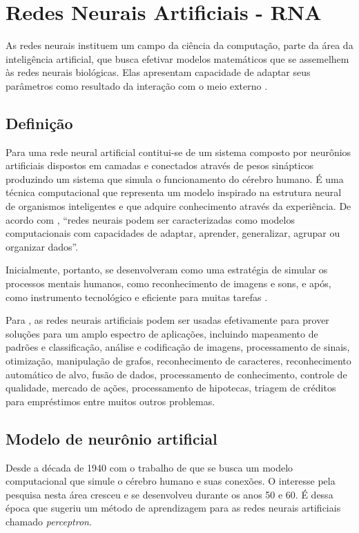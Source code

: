 \section{Redes Neurais Artificiais - RNA}
As redes neurais instituem um campo da ciência da computação, parte da área da inteligência artificial, que busca efetivar modelos matemáticos que se assemelhem às redes neurais biológicas. Elas apresentam capacidade de adaptar seus parâmetros como resultado da interação com o meio externo \cite{ferneda_redes_2006}\cite{Norvig2013}.

\subsection{Definição}

Para  uma rede neural artificial contitui-se de um sistema composto por neurônios artificiais dispostos em camadas e conectados através de pesos sinápticos produzindo um sistema que simula o funcionamento do cérebro humano. É uma técnica computacional que representa um modelo inspirado na estrutura neural de organismos inteligentes e que adquire conhecimento através da experiência. De acordo com , ``redes neurais podem ser caracterizadas como modelos computacionais com capacidades de adaptar, aprender, generalizar, agrupar ou organizar dados''.

Inicialmente, portanto, se desenvolveram como uma estratégia de simular os processos mentais humanos, como reconhecimento de imagens e sons, e após, como instrumento tecnológico e eficiente para muitas tarefas \cite{jin_development_2002}.	

Para , as redes neurais artificiais podem ser usadas efetivamente para prover soluções para um amplo espectro de aplicações, incluindo mapeamento de padrões e classificação, análise e codificação de imagens, processamento de sinais, otimização, manipulação de grafos, reconhecimento de caracteres, reconhecimento automático de alvo, fusão de dados, processamento de conhecimento, controle de qualidade, mercado de ações, processamento de hipotecas, triagem de créditos para empréstimos entre muitos outros problemas. 

\subsection{Modelo de neurônio artificial}\label{perceptron}
Desde a década de 1940 com o trabalho de  que se busca um modelo computacional que simule o cérebro humano e suas conexões. O interesse pela pesquisa nesta área cresceu e se desenvolveu durante os anos 50 e 60. É dessa época que  sugeriu um método de aprendizagem para as redes neurais artificiais chamado \textit{perceptron}. 

